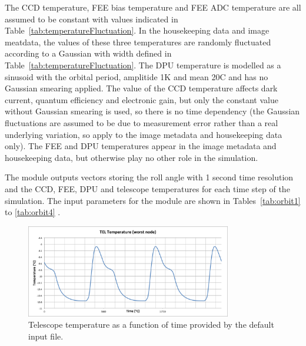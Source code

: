 \documentclass[11pt]{article}      %
\begin{document}



The CCD temperature, FEE bias temperature and FEE ADC temperature are all assumed to be constant with values indicated in Table~\ref{tab:temperatureFluctuation}. In the housekeeping data and image meatdata, the values of these three temperatures are randomly fluctuated according to a Gaussian with width defined in Table~\ref{tab:temperatureFluctuation}. The DPU temperature is modelled as a sinusoid with the orbital period, amplitide 1K and mean 20\textdegree C and has no Gaussian smearing applied. The value of the CCD temperature affects dark current, quantum efficiency and electronic gain, but only the constant value without Gaussian smearing is used, so there is no time dependency (the Gaussian fluctuations are assumed to be due to measurement error rather than a real underlying variation, so apply to the image metadata and housekeeping data only). The FEE and DPU  temperatures appear in the image metadata and housekeeping data, but otherwise play no other role in the simulation.

The module outputs vectors storing the roll angle with 1 second time resolution and the CCD, FEE, DPU and telescope temperatures for each time step of the simulation. The input parameters for the module are shown in Tables~\ref{tab:orbit1} to \ref{tab:orbit4} .

\begin{figure}[hbtp]
  \begin{center}
    \includegraphics[width=0.8\textwidth]{telescope_temperature.png}
    \caption{Telescope temperature as a function of time provided by the default input file.}
    \label{fig:telescopeTemperature}
  \end{center}
\end{figure}
\end{document}
